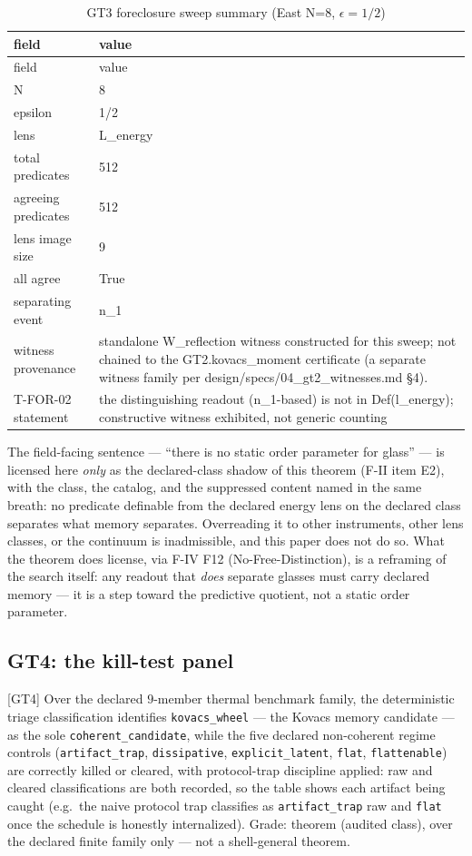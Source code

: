\documentclass[11pt]{article}
\newcommand{\claimref}[2]{[#1]}
\theoremstyle{definition}
\begin{document}
\begin{longtable}{lp{9cm}}
\caption{GT3 foreclosure sweep summary (East N=8, $\epsilon=1/2$)}\label{tab:gt3-foreclosure} \\
\toprule
field & value \\
\midrule
\endfirsthead
\toprule
field & value \\
\midrule
\endhead
\bottomrule
\endfoot
N & 8 \\
epsilon & 1/2 \\
lens & L\_energy \\
total predicates & 512 \\
agreeing predicates & 512 \\
lens image size & 9 \\
all agree & True \\
separating event & n\_1 \\
witness provenance & standalone W\_reflection witness constructed for this sweep; not chained to the GT2.kovacs\_moment certificate (a separate witness family per design/specs/04\_gt2\_witnesses.md §4). \\
T-FOR-02 statement & the distinguishing readout (n\_1-based) is not in Def(l\_energy); constructive witness exhibited, not generic counting \\
\bottomrule
\end{longtable}
 
The field-facing sentence --- ``there is no static order parameter for glass'' --- is licensed
here \emph{only} as the declared-class shadow of this theorem (F-II item E2), with the class, the
catalog, and the suppressed content named in the same breath: no predicate definable from the
declared energy lens on the declared class separates what memory separates. Overreading it to
other instruments, other lens classes, or the continuum is inadmissible, and this paper does not
do so. What the theorem does license, via F-IV F12 (No-Free-Distinction), is a reframing of the
search itself: any readout that \emph{does} separate glasses must carry declared memory --- it is
a step toward the predictive quotient, not a static order parameter.

\subsection{GT4: the kill-test panel}

\claimref{GT4}{160ed9c4bb65a8189f012fba1fb7e4a55fc17e323050437206c341c077b53619}
Over the declared $9$-member thermal benchmark family, the deterministic triage classification
identifies \texttt{kovacs\_wheel} --- the Kovacs memory candidate --- as the sole
\texttt{coherent\_candidate}, while the five declared non-coherent regime controls
(\texttt{artifact\_trap}, \texttt{dissipative}, \texttt{explicit\_latent}, \texttt{flat},
\texttt{flattenable}) are correctly killed or cleared, with protocol-trap discipline applied: raw
and cleared classifications are both recorded, so the table shows each artifact being caught
(e.g.\ the naive protocol trap classifies as \texttt{artifact\_trap} raw and \texttt{flat} once
the schedule is honestly internalized). Grade: theorem (audited class), over the declared finite
family only --- not a shell-general theorem.
\end{document}
